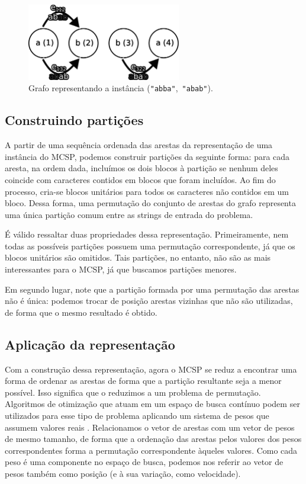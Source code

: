 \begin{figure}
    \centering
    \includegraphics[width=0.6\textwidth]{images/grafo.pdf}
    \caption{Grafo representando a instância (\texttt{"abba"},~\texttt{"abab"}).}
    \label{fig:grafo}
\end{figure}

\subsection{Construindo partições}

    A partir de uma sequência ordenada das arestas da representação de uma instância do MCSP, podemos construir partições da seguinte forma: para cada aresta, na ordem dada, incluímos os dois blocos à partição se nenhum deles coincide com caracteres contidos em blocos que foram incluídos. Ao fim do processo, cria-se blocos unitários para todos os caracteres não contidos em um bloco. Dessa forma, uma permutação do conjunto de arestas do grafo representa uma única partição comum entre as strings de entrada do problema.
    
    É válido ressaltar duas propriedades dessa representação. Primeiramente, nem todas as possíveis partições possuem uma permutação correspondente, já que os blocos unitários são omitidos. Tais partições, no entanto, não são as mais interessantes para o MCSP, já que buscamos partições menores.

    Em segundo lugar, note que a partição formada por uma permutação das arestas não é única: podemos trocar de posição arestas vizinhas que não são utilizadas, de forma que o mesmo resultado é obtido.

\subsection{Aplicação da representação}

    Com a construção dessa representação, agora o MCSP se reduz a encontrar uma forma de ordenar as arestas de forma que a partição resultante seja a menor possível. Isso significa que o reduzimos a um problema de permutação. Algoritmos de otimização que atuam em um espaço de busca contínuo podem ser utilizados para esse tipo de problema aplicando um sistema de pesos que assumem valores reais \cite[p.~661]{marti_handbook_2018}. Relacionamos o vetor de arestas com um vetor de pesos de mesmo tamanho, de forma que a ordenação das arestas pelos valores dos pesos correspondentes forma a permutação correspondente àqueles valores. Como cada peso é uma componente no espaço de busca, podemos nos referir ao vetor de pesos também como posição (e à sua variação, como velocidade).
    